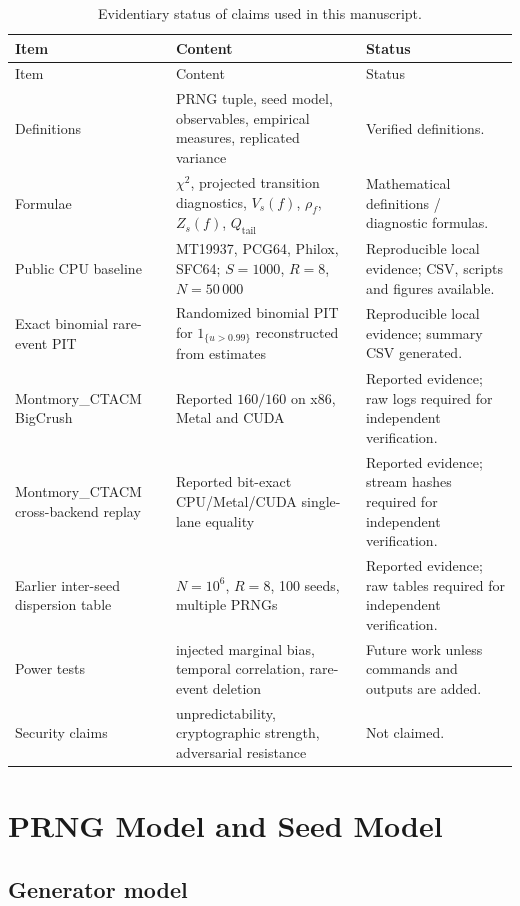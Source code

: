 \documentclass[11pt,a4paper]{article}
\newcommand{\Qtail}{Q_{\mathrm{tail}}}
\begin{document}
\small
\begin{longtable}{
>{\raggedright\arraybackslash}p{}
>{\raggedright\arraybackslash}p{}
>{\raggedright\arraybackslash}p{}}
\caption{Evidentiary status of claims used in this manuscript.}\\
\toprule
Item & Content & Status \\
\midrule
\endfirsthead
\toprule
Item & Content & Status \\
\midrule
\endhead
Definitions & PRNG tuple, seed model, observables, empirical measures, replicated variance & Verified definitions. \\
Formulae & $\chi^2$, projected transition diagnostics, $V_s(f)$, $\rho_f$, $Z_s(f)$, $\Qtail$ & Mathematical definitions / diagnostic formulas. \\
Public CPU baseline & MT19937, PCG64, Philox, SFC64; $S=1000$, $R=8$, $N=50\,000$ & Reproducible local evidence; CSV, scripts and figures available. \\
Exact binomial rare-event PIT & Randomized binomial PIT for $1_{\{u>0.99\}}$ reconstructed from estimates & Reproducible local evidence; summary CSV generated. \\
Montmory\_CTACM BigCrush & Reported $160/160$ on x86, Metal and CUDA & Reported evidence; raw logs required for independent verification. \\
Montmory\_CTACM cross-backend replay & Reported bit-exact CPU/Metal/CUDA single-lane equality & Reported evidence; stream hashes required for independent verification. \\
Earlier inter-seed dispersion table & $N=10^6$, $R=8$, 100 seeds, multiple PRNGs & Reported evidence; raw tables required for independent verification. \\
Power tests & injected marginal bias, temporal correlation, rare-event deletion & Future work unless commands and outputs are added. \\
Security claims & unpredictability, cryptographic strength, adversarial resistance & Not claimed. \\
\bottomrule
\end{longtable}
\normalsize

\section{PRNG Model and Seed Model}

\subsection{Generator model}
\end{document}
